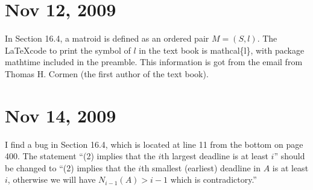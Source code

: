 \documentclass{article}
\begin{document}
\section*{Nov 12, 2009}

In Section 16.4, a matroid is defined as an ordered pair $M = (S,l)$.
The \LaTeX code to print the symbol of $l$ in the text book is
\texttt{}mathcal\{l\}, with package \textsf{mathtime} included
in the preamble.  This information is got from the email from Thomas
H. Cormen (the first author of the text book).  

\section*{Nov 14, 2009}

I find a bug in Section 16.4, which is located at line 11 from the
bottom on page 400. The statement ``(2) implies that the $i$th largest
deadline is at least $i$'' should be changed to ``(2) implies that the
$i$th smallest (earliest) deadline in $A$ is at least $i$, otherwise
we will have $N_{i-1}(A) > i-1$ which is contradictory.''
\end{document}

